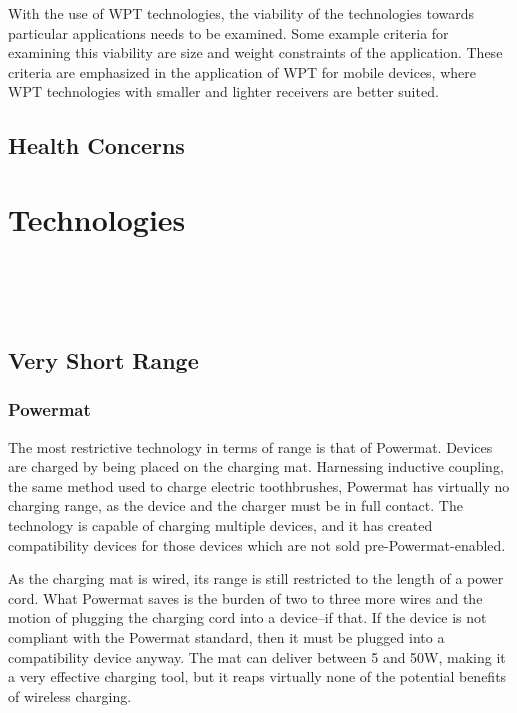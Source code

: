 With the use of WPT technologies, the viability of the technologies towards particular applications needs to be examined. Some example criteria for examining this viability are size and weight constraints of the application. These criteria are emphasized in the application of WPT for mobile devices, where WPT technologies with smaller and lighter receivers are better suited.

\subsection{Health Concerns}


\section{Technologies}
\label{sec:lit-review-tech}

\\
\\
\\

\subsection{Very Short Range}
\subsubsection{Powermat}
The most restrictive technology in terms of range is that of Powermat. Devices are charged by being placed on the charging mat. Harnessing inductive coupling, the same method used to charge electric toothbrushes, Powermat has virtually no charging range, as the device and the charger must be in full contact. The technology is capable of charging multiple devices, and it has created compatibility devices for those devices which are not sold pre-Powermat-enabled.

As the charging mat is wired, its range is still restricted to the length of a power cord. What Powermat saves is the burden of two to three more wires and the motion of plugging the charging cord into a device--if that. If the device is not compliant with the Powermat standard, then it must be plugged into a compatibility device anyway.
The mat can deliver between 5 and 50W, making it a very effective charging tool, but it reaps virtually none of the potential benefits of wireless charging.

